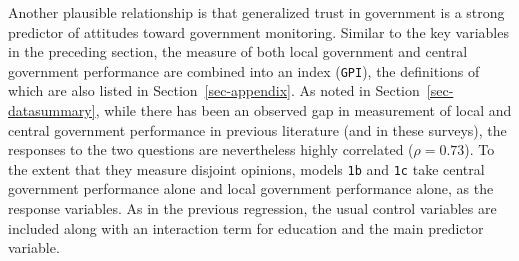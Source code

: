 \documentclass[
  number]{elsarticle}
\begin{document}
Another plausible relationship is that generalized trust in government
is a strong predictor of attitudes toward government monitoring. Similar
to the key variables in the preceding section, the measure of both local
government and central government performance are combined into an index
(\texttt{GPI}), the definitions of which are also listed in
Section~\ref{sec-appendix}. As noted in Section~\ref{sec-datasummary},
while there has been an observed gap in measurement of local and central
government performance in previous literature (and in these surveys),
the responses to the two questions are nevertheless highly correlated
(\(\rho=0.73\)). To the extent that they measure disjoint opinions,
models \texttt{1b} and \texttt{1c} take central government performance
alone and local government performance alone, as the response variables.
As in the previous regression, the usual control variables are included
along with an interaction term for education and the main predictor
variable.
\end{document}
